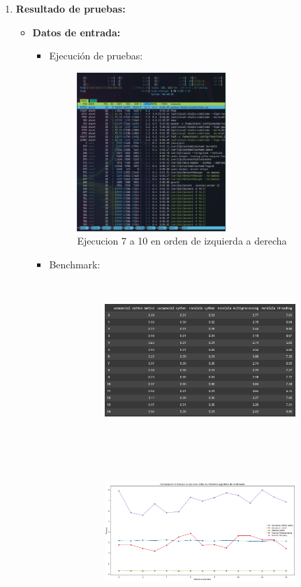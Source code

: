\documentclass[12pt, letterpaper]{article}
\begin{document}
\begin{flushleft}
\begin{enumerate}
        \vspace{10mm}
        \item \textbf{Resultado de pruebas:}
            \begin{itemize}
                \item \textbf{Datos de entrada:}
                \begin{itemize}
                    \renewcommand{\theenumi}{\alph{enumi}}
                    \item Ejecución de pruebas:
                        \begin{figure}[H]
                            \includegraphics[width=1\linewidth, height=6cm]{cythonParalelo}
                            \caption{Ejecucion 7 a 10 en orden de izquierda a derecha}
                        \end{figure}
                    \item Benchmark:
                        \begin{figure}[H]
                            \begin{subfigure}{0.49\textwidth}
                                \includegraphics[width=1\linewidth, height=6cm]{TablaBench} 
                            \end{subfigure}
                            \begin{subfigure}{0.49\textwidth}
                                \includegraphics[width=1\linewidth, height=6cm]{GrafBench}

\end{subfigure}
\end{figure}
\end{itemize}
\end{itemize}
\end{enumerate}
\end{flushleft}
\end{document}
